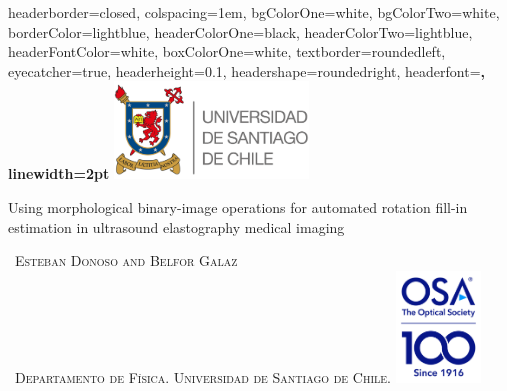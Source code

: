 \documentclass[portrait,a0paper,fontscale=0.28]{baposter} %
\begin{document}
\begin{poster}
{
headerborder=closed, %
colspacing=1em, %
bgColorOne=white, %
bgColorTwo=white, %
borderColor=lightblue, %
headerColorOne=black, %
headerColorTwo=lightblue, %
headerFontColor=white, %
boxColorOne=white, %
textborder=roundedleft, %
eyecatcher=true, %
headerheight=0.1\textheight, %
headershape=roundedright, %
headerfont=\Large\bf\textsc, %
linewidth=2pt %
}
%
{\includegraphics[height=7em]{Imago_Univ_de_Santiago_2016_2.png}} %
{\bf{\begin{LARGE}
{Using morphological binary-image operations for automated rotation fill-in estimation in ultrasound elastography medical imaging}
\end{LARGE}} \vspace{0.1em}} %
{\textsc{\ Esteban Donoso and Belfor Galaz\\
\ \hspace{8pt}Departamento de F\'isica.  Universidad de Santiago de Chile.} } %
{\includegraphics[height=8em]{OSA_100_Vertical_Color.jpg}} %


\end{poster}
\end{document}
